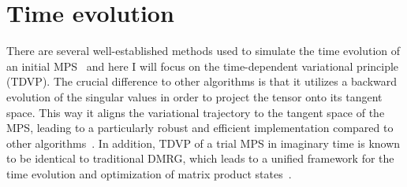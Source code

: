 \section{Time evolution}
\label{sec:time_evolution}
%
%
There are several well-established methods used to simulate the time evolution of an initial MPS~\cite{Paeckel2019} and here I will focus on the time-dependent variational principle (TDVP).
The crucial difference to other algorithms is that it utilizes a backward evolution of the singular values in order to project the tensor onto its tangent space.
This way it aligns the variational trajectory to the tangent space of the MPS, leading to a particularly robust and efficient implementation compared to other algorithms~\cite{Haegeman2011}.
In addition, TDVP of a trial MPS in imaginary time is known to be identical to traditional DMRG, which leads to a unified framework for the time evolution and optimization of matrix product states~\cite{Haegeman2016}.

